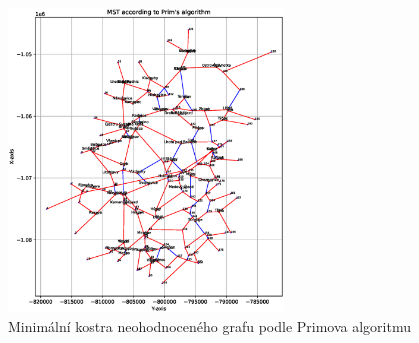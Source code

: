 \begin{figure}[H]
    \centering
    \includegraphics[width=0.65\textwidth]{images/Figure_2.eps}
    \caption{Minimální kostra neohodnoceného grafu podle Primova algoritmu}
\end{figure}


